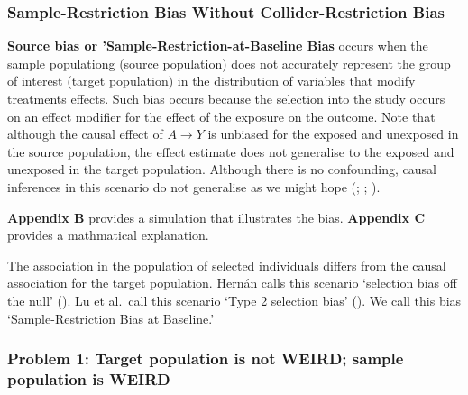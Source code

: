 \documentclass[
  single column]{article}
\begin{document}
\subsubsection{Sample-Restriction Bias Without Collider-Restriction
Bias}\label{sample-restriction-bias-without-collider-restriction-bias}

\textbf{Source bias or 'Sample-Restriction-at-Baseline Bias} occurs when
the sample populationg (source population) does not accurately represent
the group of interest (target population) in the distribution of
variables that modify treatments effects. Such bias occurs because the
selection into the study occurs on an effect modifier for the effect of
the exposure on the outcome. Note that although the causal effect of
\(A\to Y\) is unbiased for the exposed and unexposed in the source
population, the effect estimate does not generalise to the exposed and
unexposed in the target population. Although there is no confounding,
causal inferences in this scenario do not generalise as we might hope
(;
;
).

\textbf{Appendix B} provides a simulation that illustrates the bias.
\textbf{Appendix C} provides a mathmatical explanation.

\begin{table}

\caption{\label{tbl-terminologyselectionrestrictionbaseline}The
association in the population of selected individuals differs from the
causal association for the target population. Hernán calls this scenario
`selection bias off the null' (). Lu et al.~call this scenario `Type 2 selection bias'
(). We call this bias
`Sample-Restriction Bias at Baseline.'}

\centering{

\terminologyselectionrestrictionbaseline

}

\end{table}%

\subsubsection{Problem 1: Target population is not WEIRD; sample
population is
WEIRD}\label{problem-1-target-population-is-not-weird-sample-population-is-weird}
\end{document}
